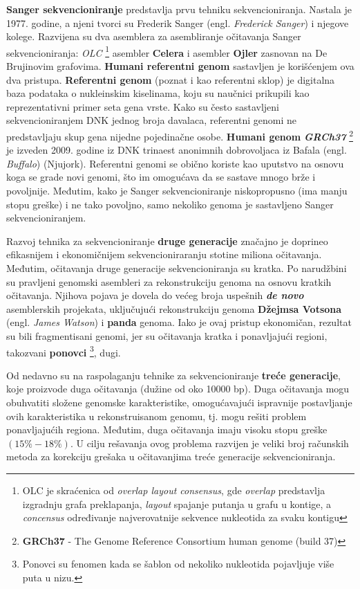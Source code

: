 \documentclass[12pt,oneside]{memoir}
\begin{document}
\textbf{Sanger sekvencioniranje} predstavlja prvu tehniku sekvencioniranja. Nastala je 1977. godine, a njeni tvorci su Frederik Sanger (engl. \textit{Frederick Sanger}) i njegove kolege. Razvijena su dva asemblera za asembliranje očitavanja Sanger sekvencioniranja: \textit{OLC} \footnote{OLC je skraćenica od \textit{overlap layout consensus}, gde \textit{overlap} predstavlja izgradnju grafa preklapanja,
\textit{layout} spajanje putanja u grafu u kontige, a \textit{concensus} određivanje najverovatnije sekvence
nukleotida za svaku kontigu} asembler \textbf{Celera} i asembler \textbf{Ojler} zasnovan na De Brujinovim grafovima. \textbf{Humani referentni genom} sastavljen je korišćenjem ova dva pristupa. \textbf{Referentni genom} (poznat i kao referentni sklop) je digitalna baza podataka o nukleinskim kiselinama, koju su naučnici prikupili kao reprezentativni primer seta gena vrste. Kako su često sastavljeni sekvencioniranjem DNK jednog broja davalaca, referentni genomi ne predstavljaju skup gena nijedne pojedinačne osobe. \textbf{Humani genom} \textit{\textbf{GRCh37}} \footnote{\textbf{GRCh37} - The Genome Reference Consortium human genome (build 37)} je izveden 2009. godine iz DNK trinaest anonimnih dobrovoljaca iz Bafala (engl. \textit{Buffalo}) (Njujork). Referentni genomi se obično koriste kao uputstvo na osnovu koga se grade novi genomi, što im omogućava da se sastave mnogo brže i povoljnije. Međutim, kako je Sanger sekvencioniranje niskopropusno (ima manju stopu greške) i ne tako povoljno, samo nekoliko genoma je sastavljeno Sanger sekvencioniranjem.

Razvoj tehnika za sekvencioniranje \textbf{druge generacije} značajno je doprineo efikasnijem i ekonomičnijem sekvencioniraranju stotine miliona očitavanja. Međutim, očitavanja druge generacije sekvencioniranja su kratka. Po narudžbini su pravljeni genomski asembleri za rekonstrukciju genoma na osnovu kratkih očitavanja. Njihova pojava je dovela do većeg broja uspešnih \textbf{\textit{de novo}} asemblerskih projekata, uključujući rekonstrukciju genoma \textbf{Džejmsa Votsona} (engl. \textit{James Watson}) i \textbf{panda} genoma. Iako je ovaj pristup ekonomičan, rezultat su bili fragmentisani genomi, jer su očitavanja kratka i ponavljajući regioni, takozvani \textbf{ponovci} \footnote{Ponovci su fenomen kada se šablon od nekoliko nukleotida pojavljuje više puta u nizu.}, dugi.

Od nedavno su na raspolaganju tehnike za sekvencioniranje \textbf{treće generacije}, koje proizvode duga očitavanja (dužine od oko 10000 bp). Duga očitavanja mogu obuhvatiti složene genomske karakteristike, omogućavajući ispravnije postavljanje ovih karakteristika u rekonstruisanom genomu, tj. mogu rešiti problem ponavljajućih regiona. Međutim, duga očitavanja imaju visoku stopu greške $(15\%-18\%)$. U cilju rešavanja ovog problema razvijen je veliki broj računskih metoda za korekciju grešaka u očitavanjima treće generacije sekvencioniranja.
\end{document}
